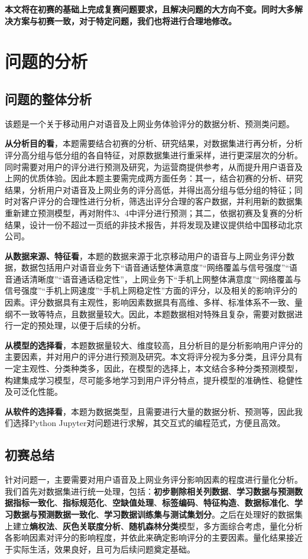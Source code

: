 \documentclass{MathorCupmodeling}
\begin{document}
	\textbf{本文将在初赛的基础上完成复赛问题要求，且解决问题的大方向不变。同时大多解决方案与初赛一致，对于特定问题，我们也将进行合理地修改。}

	\section{问题的分析}
	\subsection{问题的整体分析}
	该题是一个关于移动用户对语音及上网业务体验评分的数据分析、预测类问题。

	\textbf{从分析目的看}，本题需要结合初赛的分析、研究结果，对数据集进行再分析，分析评分高分组与低分组的各自特征，对原数据集进行重采样，进行更深层次的分析。同时需要对用户的评分进行预测及研究，为运营商提供参考，从而提升用户语音及上网的优质体验。因此本题主要需完成两方面任务：{\heiti 其一}，结合初赛的分析、研究结果，分析用户对语音及上网业务的评分高低，并得出高分组与低分组的特征；同时对客户评分的合理性进行分析，筛选出评分合理的客户数据，并利用新的数据集重新建立预测模型，再对附件3、4中评分进行预测；{\heiti 其二}，依据初赛及复赛的分析结果，设计一份不超过一页纸的非技术报告，并将发现及建议提供给中国移动北京公司。

	\textbf{从数据来源、特征看}，本题的数据来源于北京移动用户的语音与上网业务评分数据，数据包括用户对语音业务下“语音通话整体满意度”“网络覆盖与信号强度”“语音通话清晰度”“语音通话稳定性”，上网业务下“手机上网整体满意度”“网络覆盖与信号强度”“手机上网速度”“手机上网稳定性”方面的评分，以及相关的影响评分的因素。评分数据具有主观性，影响因素数据具有高维、多样、标准体系不一致、量纲不一致等特点，且数据量较大。因此，本题数据相对特殊且复杂，需要对数据进行一定的预处理，以便于后续的分析。
	
	\textbf{从模型的选择看}，本题数据量较大、维度较高，且分析目的是分析影响用户评分的主要因素，并对用户的评分进行预测及研究。本文将评分视为多分类，且评分具有一定主观性、分类种类多，因此，在模型的选择上，本文结合多种分类预测模型，构建集成学习模型，尽可能多地学习到用户评分特点，提升模型的准确性、稳健性及可泛化性能。

	\textbf{从软件的选择看}，本题为数据类型，且需要进行大量的数据分析、预测等，因此我们选择Python Jupyter对问题进行求解，其交互式的编程范式，方便且高效。

	\subsection{初赛总结}
	{\heiti 针对问题一}，主要需要对用户语音及上网业务评分影响因素的程度进行量化分析。我们首先对数据集进行统一处理，包括：\textbf{初步剔除相关列数据}、\textbf{学习数据与预测数据指标一致化}、\textbf{指标规范化}、\textbf{空缺值处理}、\textbf{标签编码}、\textbf{特征构造}、\textbf{数据标准化}、\textbf{学习数据与预测数据一致化}、\textbf{学习数据训练集与测试集划分}。之后在处理好的数据集上建立\textbf{熵权法}、\textbf{灰色关联度分析}、\textbf{随机森林分类}模型，多方面综合考虑，量化分析各影响因素对评分的影响程度，并依此来确定影响评分的主要因素。量化结果接近于实际生活，效果良好，且可为后续问题奠定基础。
	
\end{document}
